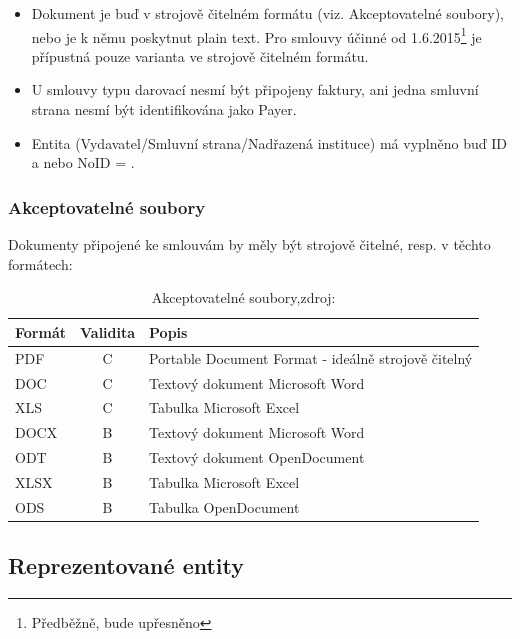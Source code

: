 \begin{itemize}
\item Dokument je buď v strojově čitelném formátu (viz. Akceptovatelné soubory), nebo je k němu poskytnut plain text. Pro smlouvy účinné od 1.6.2015\footnote{Předběžně, bude upřesněno} je přípustná pouze varianta ve strojově čitelném formátu.
\item U smlouvy typu darovací nesmí být připojeny faktury, ani jedna smluvní strana nesmí být identifikována jako Payer.
\item Entita (Vydavatel/Smluvní strana/Nadřazená instituce) má vyplněno buď ID a nebo NoID = .
\end{itemize}

\subsubsection*{Akceptovatelné soubory}

Dokumenty připojené ke smlouvám by měly být strojově čitelné, resp. v těchto formátech:

\begin{table}[h]
\centering
\begin{tabular}{lcl}
\textbf{Formát} & \textbf{Validita} & \textbf{Popis} \\
\hline
\rowcolor{validateC}PDF & C & Portable Document Format - ideálně strojově čitelný \\
\rowcolor{validateC}DOC & C & Textový dokument Microsoft Word \\
\rowcolor{validateC}XLS & C & Tabulka Microsoft Excel \\
\rowcolor{validateB}DOCX & B & Textový dokument Microsoft Word \\
\rowcolor{validateB}ODT & B & Textový dokument OpenDocument \\
\rowcolor{validateB}XLSX & B & Tabulka Microsoft Excel \\
\rowcolor{validateB}ODS & B & Tabulka OpenDocument \\
\end{tabular}
\caption{Akceptovatelné soubory,zdroj:\protect\cite{metodika}}
\end{table}

\newpage

\subsection{Reprezentované entity}

\medskip

